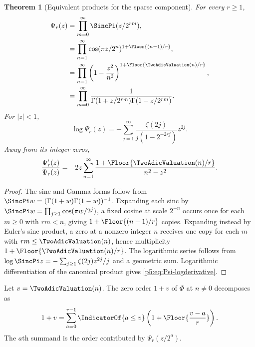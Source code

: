 \documentclass[11pt]{article}
\newtheorem{theorem}{Theorem}[section]
\theoremstyle{definition}
\theoremstyle{remark}
\begin{document}
\begin{theorem}[Equivalent products for the sparse component]
\label{p5:thm:Psi-products}
For every $r\ge1$,
\begin{align}
 \Psi_r(z)
 &=\prod_{m=0}^{\infty}\SincPi(z/2^{rm}),                  \label{p5:eq:Psi-sinc}\\
 &=\prod_{n=1}^{\infty}
   \cos(\pi z/2^n)^{1+\Floor{(n-1)/r}},              \label{p5:eq:Psi-cos}\\
 &=\prod_{n=1}^{\infty}
   \left(1-\frac{z^2}{n^2}\right)^{1+\Floor{\TwoAdicValuation(n)/r}}, \label{p5:eq:Psi-canonical}\\
 &=\prod_{m=0}^{\infty}
   \frac1{\Gamma(1+z/2^{rm})\Gamma(1-z/2^{rm})}.           \label{p5:eq:Psi-gamma}
\end{align}
For $|z|<1$,
\begin{equation}
 \log\Psi_r(z)
 =-\sum_{j=1}^{\infty}
   \frac{\zeta(2j)}{j(1-2^{-2rj})}z^{2j}.                 \label{p5:eq:Psi-log-zeta}
\end{equation}
Away from its integer zeros,
\begin{equation}
 \frac{\Psi_r'(z)}{\Psi_r(z)}
 =-2z\sum_{n=1}^{\infty}
   \frac{1+\Floor{\TwoAdicValuation(n)/r}}{n^2-z^2}.            \label{p5:eq:Psi-logderivative}
\end{equation}
\end{theorem}

\begin{proof}
The sinc and Gamma forms follow from
$\SincPi w=(\Gamma(1+w)\Gamma(1-w))^{-1}$.  Expanding each sinc by
$\SincPi w=\prod_{j\ge1}\cos(\pi w/2^j)$, a fixed cosine at scale $2^{-n}$
occurs once for each $m\ge0$ with $rm<n$, giving
$1+\Floor{(n-1)/r}$ copies.  Expanding instead by Euler's sine product,
a zero at a nonzero integer $n$ receives one copy for each $m$ with
$rm\le\TwoAdicValuation(n)$, hence multiplicity $1+\Floor{\TwoAdicValuation(n)/r}$.
The logarithmic series follows from
\(
 \log\SincPi z=-\sum_{j\ge1}\zeta(2j)z^{2j}/j
\)
and a geometric sum.  Logarithmic differentiation of the canonical product
gives \eqref{p5:eq:Psi-logderivative}.
\end{proof}

\begin{corollary}
\label{p5:cor:zero-divisor-split}
Let $v=\TwoAdicValuation(n)$.  The zero order $1+v$ of $\Phi$ at $n\ne0$ decomposes as
\begin{equation}
 1+v=\sum_{a=0}^{r-1}
 \IndicatorOf{a\le v}\left(1+\Floor{\frac{v-a}{r}}\right). \label{p5:eq:valuation-split}
\end{equation}
The $a$th summand is the order contributed by $\Psi_r(z/2^a)$.
\end{corollary}
\end{document}
